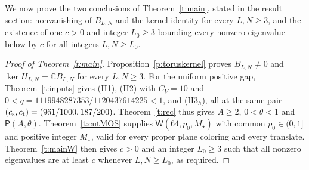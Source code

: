 We now prove the two conclusions of Theorem~\ref{t:main}, stated in
the result section: nonvanishing of \(B_{L,N}\) and the kernel
identity for every \(L,N\ge3\), and the existence of one
\(c>0\) and integer \(L_0\ge3\) bounding every nonzero eigenvalue
below by \(c\) for all integers \(L,N\ge L_0\).

\begin{proof}[Proof of Theorem~\ref{t:main}]
Proposition~\ref{p:toruskernel} proves \(B_{L,N}\ne0\) and
\(\ker H_{L,N}=\mathbb C B_{L,N}\) for every \(L,N\ge3\).
For the uniform positive gap, Theorem~\ref{t:inputs} gives (H1),
(H2) with \(C_V=10\) and
\(0<q=1119948287353/1120437614225<1\), and (H3\(_h\)), all at
the same pair \((c_{\rm s},c_{\rm t})=(961/1000,187/200)\).
Theorem~\ref{t:rec} thus gives \(A\ge2\), \(0<\theta<1\) and
\(\mathsf P(A,\theta)\).
Theorem~\ref{t:cutMOS} supplies
\(\mathsf W(64,p_0,M_\star)\) with common
\(p_0\in(0,1]\) and positive integer \(M_\star\), valid for
every proper plane coloring and every translate.
Theorem~\ref{t:mainW} then gives \(c>0\) and an integer
\(L_0\ge3\) such that all nonzero eigenvalues are at least \(c\)
whenever \(L,N\ge L_0\), as required.
\end{proof}
